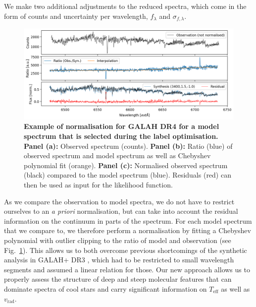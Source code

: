 \documentclass[
  journal=pasa,
  manuscript=research-paper, %
  year=2024,
  volume=37
]{cup-journal}
\newcommand{\SB}[1]{{\textcolor{purple}{#1}}}
\newcommand{\Teff}{$T_\mathrm{eff}$\xspace}
\newcommand{\logg}{$\log g$\xspace}
\newcommand{\feh}{$\mathrm{[Fe/H]}$\xspace}
\newcommand{\vrad}{$v_\mathrm{rad}$\xspace}
\newcommand{\TheCannon}{\textit{The Cannon}\xspace}
\newcommand{\dex}{\,\mathrm{dex}}	%
\newcommand{\K}{\,\mathrm{K}}	%
\begin{document}
We make two additional adjustments to the reduced spectra, which come in the form of counts and uncertainty per wavelength, $f_\lambda$ and $\sigma_{f,\lambda}$.

\begin{figure}[ht]
\centering
\includegraphics[width=\textwidth]{figures/Nuisance_example.png}
\caption{
\textbf{Example of normalisation for GALAH DR4 for a model spectrum that is selected during the label optimisation.}
\textbf{Panel (a):} Observed spectrum (counts).
\textbf{Panel (b):} Ratio (blue) of observed spectrum and model spectrum as well as Chebyshev polynomial fit (orange).
\textbf{Panel (c):} Normalised observed spectrum (black) compared to the model spectrum (blue). Residuals (red) can then be used as input for the likelihood function.
}
\label{fig:ratio_normalisation}
\end{figure}

As we compare the observation to model spectra, we do not have to restrict ourselves to an \textit{a priori} normalisation, but can take into account the residual information on the continuum in parts of the spectrum. For each model spectrum that we compare to, we therefore perform a normalisation by fitting a Chebyshev polynomial with outlier clipping to the ratio of model and observation (see Fig.~\ref{fig:ratio_normalisation}). This allows us to both overcome previous shortcomings of the synthetic analysis in GALAH+ DR3 \citep{Buder2021}, which had to be restricted to small wavelength segments and assumed a linear relation for those. Our new approach allows us to properly assess the structure of deep and steep molecular features that can dominate spectra of cool stars and carry significant information on \Teff as well as \vrad.

\end{document}
